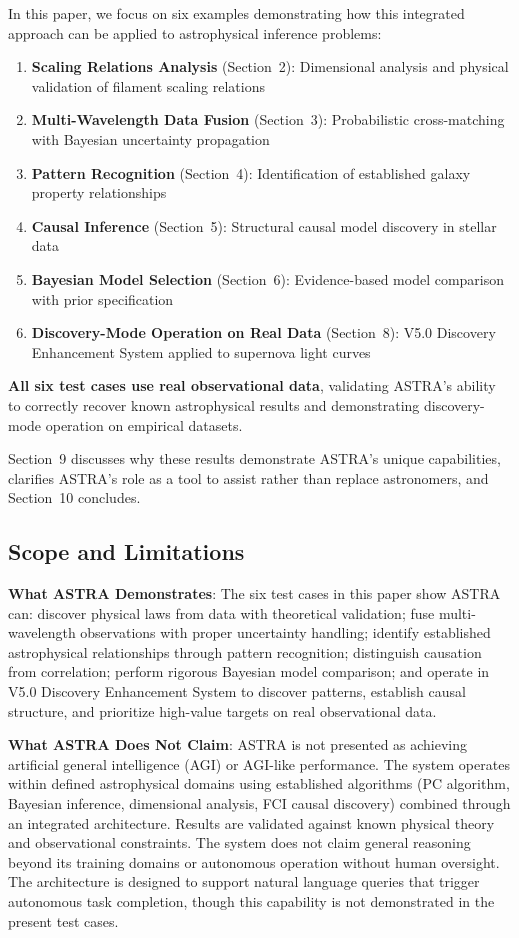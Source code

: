 \documentclass[usenatbib]{rasti}
\begin{document}
In this paper, we focus on six examples demonstrating how this integrated approach can be applied to astrophysical inference problems:
\begin{enumerate}
\item \textbf{Scaling Relations Analysis} (Section~2): Dimensional analysis and physical validation of filament scaling relations
\item \textbf{Multi-Wavelength Data Fusion} (Section~3): Probabilistic cross-matching with Bayesian uncertainty propagation
\item \textbf{Pattern Recognition} (Section~4): Identification of established galaxy property relationships
\item \textbf{Causal Inference} (Section~5): Structural causal model discovery in stellar data
\item \textbf{Bayesian Model Selection} (Section~6): Evidence-based model comparison with prior specification
\item \textbf{Discovery-Mode Operation on Real Data} (Section~8): V5.0 Discovery Enhancement System applied to supernova light curves
\end{enumerate}

\textbf{All six test cases use real observational data}, validating ASTRA's ability to correctly recover known astrophysical results and demonstrating discovery-mode operation on empirical datasets.

Section~9 discusses why these results demonstrate ASTRA's unique capabilities, clarifies ASTRA's role as a tool to assist rather than replace astronomers, and Section~10 concludes.

\subsection{Scope and Limitations}

\textbf{What ASTRA Demonstrates}: The six test cases in this paper show ASTRA can: discover physical laws from data with theoretical validation; fuse multi-wavelength observations with proper uncertainty handling; identify established astrophysical relationships through pattern recognition; distinguish causation from correlation; perform rigorous Bayesian model comparison; and operate in V5.0 Discovery Enhancement System to discover patterns, establish causal structure, and prioritize high-value targets on real observational data.

\textbf{What ASTRA Does Not Claim}: ASTRA is not presented as achieving artificial general intelligence (AGI) or AGI-like performance. The system operates within defined astrophysical domains using established algorithms (PC algorithm, Bayesian inference, dimensional analysis, FCI causal discovery) combined through an integrated architecture. Results are validated against known physical theory and observational constraints. The system does not claim general reasoning beyond its training domains or autonomous operation without human oversight. The architecture is designed to support natural language queries that trigger autonomous task completion, though this capability is not demonstrated in the present test cases.
\end{document}
